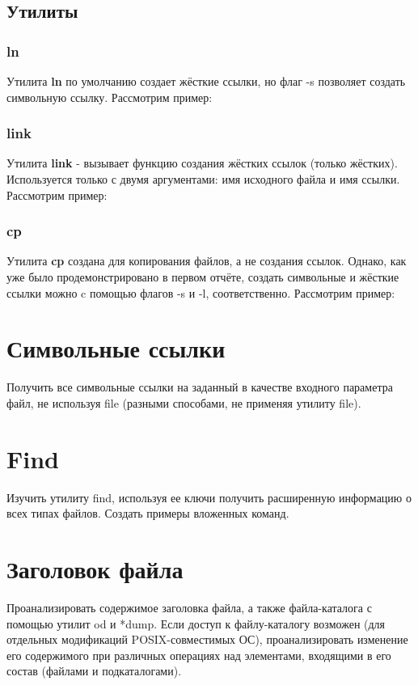 \documentclass[a4paper]{article}
\begin{document}
\subsection{Утилиты}
\subsubsection{ln}

Утилита \textbf{ln} по умолчанию создает жёсткие ссылки, но флаг -s позволяет создать символьную ссылку. Рассмотрим пример:


\subsubsection{link}

Утилита \textbf{link} - вызывает функцию создания жёстких ссылок (только жёстких). Используется только с двумя аргументами: имя исходного файла и имя ссылки. Рассмотрим пример:


\subsubsection{cp}

Утилита \textbf{cp} создана для копирования файлов, а не создания ссылок. Однако, как уже было продемонстрировано в первом отчёте, создать символьные и жёсткие ссылки можно c помощью флагов -s и -l, соответственно. Рассмотрим пример:


\section{Символьные ссылки} Получить все символьные ссылки на заданный в качестве входного параметра файл, не используя file (разными способами, не применяя утилиту file).

\section{Find} Изучить утилиту find, используя ее ключи получить расширенную информацию о всех типах файлов. Создать примеры вложенных команд.

\section{Заголовок файла} Проанализировать содержимое заголовка файла, а также файла-каталога с помощью утилит od  и  *dump. 
Если доступ к файлу-каталогу возможен (для отдельных модификаций POSIX-совместимых ОС), проанализировать изменение его содержимого при различных операциях над элементами, входящими в его состав (файлами и подкаталогами).  
\end{document}
